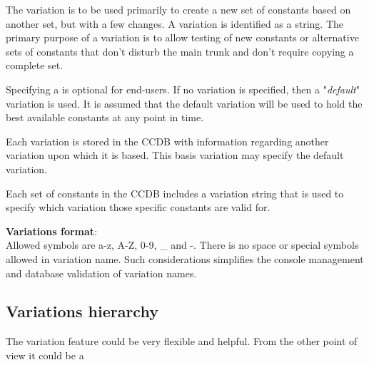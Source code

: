 \documentclass{article}
\begin{document}
The variation is to be used primarily to create a new set of constants based
on another set, but with a few changes. A variation is identified as a string.
The primary purpose of a variation is to allow testing of new constants or
alternative sets of constants that don't disturb the main trunk and don't
require copying a complete set.

Specifying a is optional for end-users. If no variation is specified, then a
"\textit{default}" variation is used. It is assumed that the default variation
will be used to hold the best available constants at any point in time.

Each variation is stored in the CCDB with information regarding another
variation upon which it is based. This basis variation may specify the default variation.

Each set of constants in the CCDB includes a variation string that is used to
specify which variation those specific constants are valid for.

\textbf{Variations format}:\\
Allowed symbols are a-z, A-Z, 0-9, \_ and -. There is no space or special symbols
allowed in variation name. Such considerations simplifies the console management
and database validation of variation names.

\subsection{Variations hierarchy}

The variation feature could be very flexible and helpful. From the other point of view
it could be a 
\end{document}
